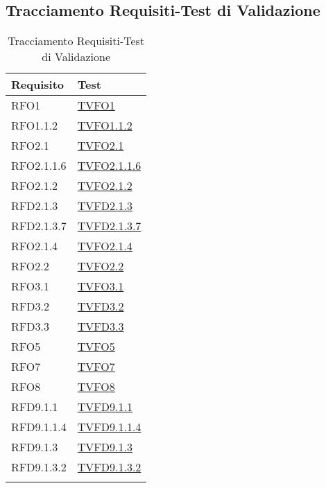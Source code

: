 \subsection{Tracciamento Requisiti-Test di Validazione}
\normalsize
\begin{longtable}{|>{\centering}m{5cm}|m{5cm}<{\centering}|}
\hline 
\textbf{Requisito} & \textbf{Test}\\
\hline
\endhead
RFO1 & \hyperlink{TVFO1}{TVFO1}\\ \hline
RFO1.1.2 & \hyperlink{TVFO1.1.2}{TVFO1.1.2}\\ \hline
RFO2.1 & \hyperlink{TVFO2.1}{TVFO2.1}\\ \hline
RFO2.1.1.6 & \hyperlink{TVFO2.1.1.6}{TVFO2.1.1.6}\\ \hline
RFO2.1.2 & \hyperlink{TVFO2.1.2}{TVFO2.1.2}\\ \hline
RFD2.1.3 & \hyperlink{TVFD2.1.3}{TVFD2.1.3}\\ \hline
RFD2.1.3.7 & \hyperlink{TVFD2.1.3.7}{TVFD2.1.3.7}\\ \hline
RFO2.1.4 & \hyperlink{TVFO2.1.4}{TVFO2.1.4}\\ \hline
RFO2.2 & \hyperlink{TVFO2.2}{TVFO2.2}\\ \hline
RFO3.1 & \hyperlink{TVFO3.1}{TVFO3.1}\\ \hline
RFD3.2 & \hyperlink{TVFD3.2}{TVFD3.2}\\ \hline
RFD3.3 & \hyperlink{TVFD3.3}{TVFD3.3}\\ \hline
RFO5 & \hyperlink{TVFO5}{TVFO5}\\ \hline
RFO7 & \hyperlink{TVFO7}{TVFO7}\\ \hline
RFO8 & \hyperlink{TVFO8}{TVFO8}\\ \hline
RFD9.1.1 & \hyperlink{TVFD9.1.1}{TVFD9.1.1}\\ \hline
RFD9.1.1.4 & \hyperlink{TVFD9.1.1.4}{TVFD9.1.1.4}\\ \hline
RFD9.1.3 & \hyperlink{TVFD9.1.3}{TVFD9.1.3}\\ \hline
RFD9.1.3.2 & \hyperlink{TVFD9.1.3.2}{TVFD9.1.3.2}\\ \hline
\caption[Tracciamento Requisiti-Test di Validazione]{Tracciamento Requisiti-Test di Validazione}
\label{tabella:requi-tv}
\end{longtable}
\clearpage
